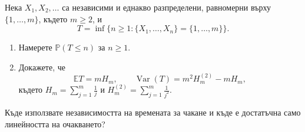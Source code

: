 \documentclass[11pt,a4paper]{article}
\newenvironment{enumeratea}{\begin{enumerate}[label=(\alph*),itemsep=0.28em,topsep=0.25em]}{\end{enumerate}}
\newcommand{\Pbb}{\mathbb P}
\newcommand{\Ebb}{\mathbb E}
\newcommand{\Var}{\operatorname{Var}}
\newcounter{problem}[section]
\begin{document}
\begin{problemstar}
Нека $X_1,X_2,\dots$ са независими и еднакво разпределени, равномерни върху
$\{1,\dots,m\}$, където $m\ge2$, и
\[
T=\inf\{n\ge1:\{X_1,\dots,X_n\}=\{1,\dots,m\}\}.
\]
\begin{enumeratea}
  \item Намерете $\Pbb(T\le n)$ за $n\ge1$.
  \item Докажете, че
  \[
  \Ebb T=mH_m,
  \qquad
  \Var(T)=m^2H_m^{(2)}-mH_m,
  \]
  където $H_m=\sum_{j=1}^m\frac1j$ и
  $H_m^{(2)}=\sum_{j=1}^m\frac1{j^2}$.
\end{enumeratea}
Къде използвате независимостта на времената за чакане и къде е достатъчна
само линейността на очакването?
\end{problemstar}
\end{document}
